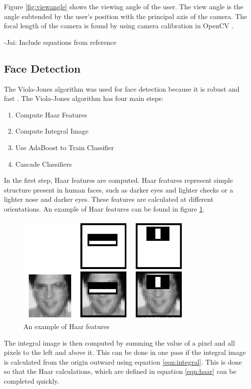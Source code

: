 \documentclass[12pt,twocolumn,letterpaper]{article}
\begin{document}
Figure \ref{fig:viewangle} shows the viewing angle of the user. The view angle is the angle subtended by the user's position with the principal axis of the camera. The focal length of the camera is found by using camera calibration in OpenCV \cite{calibration}. 

    -Jai: Include equations from reference


\subsection{Face Detection}
The Viola-Jones algorithm was used for face detection because it is robust and fast \cite{Viola-Jones}.  The Viola-Jones algorithm has four main steps:

\begin{enumerate}
\item Compute Haar Features
\item Compute Integral Image
\item Use AdaBoost to Train Classifier
\item Cascade Classifiers
\end{enumerate}

In the first step, Haar features are computed.  Haar features represent simple structure present in human faces, such as darker eyes and lighter cheeks or a lighter nose and darker eyes.  These features are calculated at different orientations. An example of Haar features can be found in figure \ref{fig:Haar}.

\begin{figure}[!htbp]
\centering
\includegraphics[scale=0.5]{haar}
\caption{An example of Haar features}
\label{fig:Haar}
\end{figure}

The integral image is then computed by summing the value of a pixel and all pixels to the left and above it.  This can be done in one pass if the integral image is calculated from the origin outward using equation \ref{eqn:integral}. This is done so that the Haar calculations, which are defined in equation \ref{eqn:haar} can be completed quickly.
\end{document}
